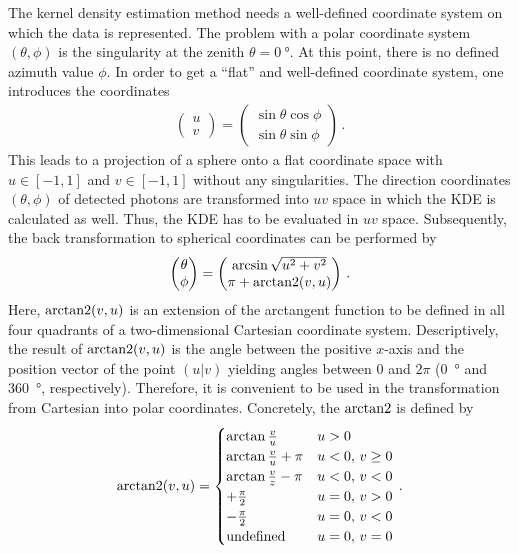 The kernel density estimation method needs a well-defined coordinate system on which the data is represented. The problem with a polar coordinate system $(\theta,\phi)$ is the singularity at the zenith $\theta=\SI{0}{\degree}$. At this point, there is no defined azimuth value $\phi$. In order to get a \enquote{flat} and well-defined coordinate system, one introduces the coordinates
\begin{align}
	\begin{pmatrix}u\\v\end{pmatrix} = \begin{pmatrix}\sin\theta\cos\phi\\\sin\theta\sin\phi\end{pmatrix}\,.
\end{align}
This leads to a projection of a sphere onto a flat coordinate space with $u\in[-1,1]$ and $v\in[-1,1]$ without any singularities. The direction coordinates $(\theta,\phi)$ of detected photons are transformed into $uv$ space in which the KDE is calculated as well. Thus, the KDE has to be evaluated in $uv$ space. Subsequently, the back transformation to spherical coordinates can be performed by
\begin{align}
	\begin{pmatrix}
		\theta\\
		\phi
	\end{pmatrix}
	= 
	\begin{pmatrix}
		\arcsin\sqrt{u^2+v^2}\\
		\pi+\operatorname{arctan2}(v,u)
		\end{pmatrix}\,.
\end{align} 
Here, $\operatorname{arctan2}(v,u)$ is an extension of the arctangent function to be defined in all four quadrants of a two-dimensional Cartesian coordinate system. Descriptively, the result of $\operatorname{arctan2}(v,u)$ is the angle between the positive $x$-axis and the position vector of the point $(u|v)$ yielding angles between $0$ and $2\pi$ (\SI{0}{\degree} and \SI{360}{\degree}, respectively). Therefore, it is convenient to be used in the transformation from Cartesian into polar coordinates. Concretely, the $\operatorname{arctan2}$ is defined by
\begin{align}
	\operatorname{arctan2}(v,u)=
	\begin{cases}
		\arctan\frac{v}{u} & u > 0\\
		\arctan\frac{v}{u} + \pi & u < 0,\,v \geq 0\\
		\arctan\frac{v}{z} - \pi & u < 0,\,v < 0 \\
		+\frac{\pi}{2} & u = 0,\,v > 0\\
		-\frac{\pi}{2} & u = 0,\,v < 0\\
		\text{undefined} & u = 0,\,v = 0
	\end{cases}\,.
\end{align}

